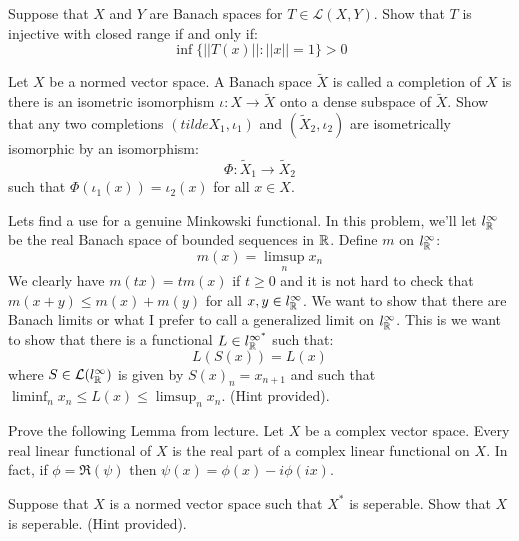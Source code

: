 \documentclass[12pt]{article}
\begin{document}
\begin{problab}{35}
    Suppose that $X$ and $Y$ are Banach spaces for $T \in \mathcal{L}(X, Y)$. Show that $T$ is injective with closed range if and only if: 
    \[ \inf \{||T(x)|| : ||x|| = 1\} > 0 \]
\end{problab}
\begin{solu} 

\end{solu}
\newpage 


\begin{problab}{38}
    Let $X$ be a normed vector space. A Banach space $\tilde{X}$ is called a completion of $X$ is there is an isometric isomorphism $\iota: X \to \tilde{X}$ onto a dense subspace of $\tilde{X}$. Show that any two completions $(tilde{X}_1, \iota_1)$ and $(\tilde{X}_2, \iota_2)$ are isometrically isomorphic by an isomorphism: 
    \[ \Phi: \tilde{X}_1 \to \tilde{X}_2\]
    such that $\Phi(\iota_1(x)) = \iota_2(x)$ for all $x \in X$. 
\end{problab}
\begin{solu} 

\end{solu}
\newpage 

\begin{problab}{39}
    Lets find a use for a genuine Minkowski functional. In this problem, we'll let $l_\mathbb R^\infty$ be the real Banach space of bounded sequences in $\mathbb R$. Define $m$ on $l_\mathbb R^\infty$: 
    \[ m(x) = \limsup_n x_n\]
    We clearly have $m(tx) = tm(x)$ if $t \geq 0$ and it is not hard to check that $m(x+y) \leq m(x) + m(y)$ for all $x, y \in l_\mathbb R^\infty$. We want to show that there are Banach limits or what I prefer to call a generalized limit on $l_\mathbb R^\infty$. This is we want to show that there is a functional $L \in l_\mathbb R^{\infty^*}$ such that:
    \[ L(S(x)) = L(x)\] 
    where $S \in \mathcal{L}(l_\mathbb R^\infty)$ is given by $S(x)_n = x_{n+1}$ and such that $\liminf_n x_n \leq L(x) \leq \limsup_n x_n$. (Hint provided).
\end{problab}
\begin{solu} 

\end{solu}
\newpage 

\begin{problab}{40}
    Prove the following Lemma from lecture. Let $X$ be a complex vector space. Every real linear functional of $X$ is the real part of a complex linear functional on $X$. In fact, if $\phi = \Re(\psi)$ then $\psi(x) = \phi(x) - i\phi(ix)$. 
\end{problab}
\begin{solu} 

\end{solu}
\newpage 

\begin{problab}{41}
    Suppose that $X$ is a normed vector space such that $X^*$ is seperable. Show that $X$ is seperable. (Hint provided).
\end{problab}
\begin{solu} 

\end{solu}
\newpage 
\end{document}
